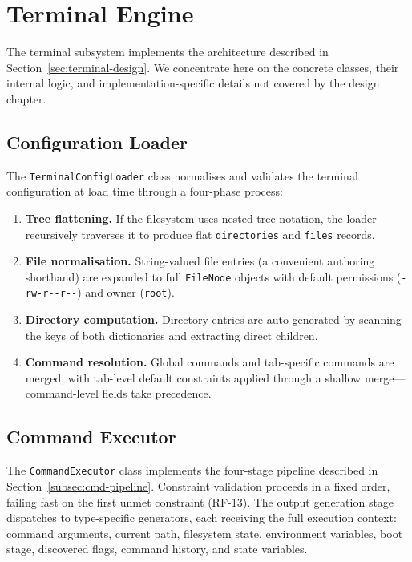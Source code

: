 \section{Terminal Engine}\label{sec:terminal-impl}

The terminal subsystem implements the architecture described in Section~\ref{sec:terminal-design}. We concentrate here on the concrete classes, their internal logic, and implementation-specific details not covered by the design chapter.

\subsection{Configuration Loader}\label{subsec:config-loader}

The \texttt{TerminalConfigLoader} class normalises and validates the terminal configuration at load time through a four-phase process:

\begin{enumerate}
    \item \textbf{Tree flattening.} If the filesystem uses nested tree notation, the loader recursively traverses it to produce flat \texttt{directories} and \texttt{files} records.
    \item \textbf{File normalisation.} String-valued file entries (a convenient authoring shorthand) are expanded to full \texttt{FileNode} objects with default permissions (\texttt{-rw-r-{}-r-{}-}) and owner (\texttt{root}).
    \item \textbf{Directory computation.} Directory entries are auto-generated by scanning the keys of both dictionaries and extracting direct children.
    \item \textbf{Command resolution.} Global commands and tab-specific commands are merged, with tab-level default constraints applied through a shallow merge---command-level fields take precedence.
\end{enumerate}

\subsection{Command Executor}\label{subsec:executor}

The \texttt{CommandExecutor} class implements the four-stage pipeline described in Section~\ref{subsec:cmd-pipeline}. Constraint validation proceeds in a fixed order, failing fast on the first unmet constraint (RF-13). The output generation stage dispatches to type-specific generators, each receiving the full execution context: command arguments, current path, filesystem state, environment variables, boot stage, discovered flags, command history, and state variables.

